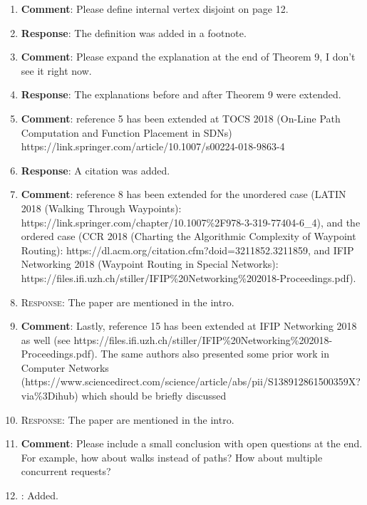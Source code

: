 \documentclass[11pt]{article}
\begin{document}
\begin{enumerate}
\item \textbf{Comment}: Please define internal vertex disjoint on page
  12.

\item[] \textbf{Response}: The definition was added in a footnote.

\item \textbf{Comment}: Please expand the explanation at the end of
  Theorem 9, I don't see it right now.

\item[] \textbf{Response}: The explanations before and after Theorem 9
  were extended.
  
\item \textbf{Comment}: reference 5 has been extended at TOCS 2018
  (On-Line Path Computation and Function Placement in SDNs)
  https://link.springer.com/article/10.1007/s00224-018-9863-4

\item[] \textbf{Response}: A citation was added.

\item \textbf{Comment}: reference 8 has been extended for the
  unordered case (LATIN 2018 (Walking Through Waypoints):
  https://link.springer.com/chapter/10.1007\%2F978-3-319-77404-6\_4),
  and the ordered case (CCR 2018 (Charting the Algorithmic Complexity
  of Waypoint Routing):
  https://dl.acm.org/citation.cfm?doid=3211852.3211859, and IFIP
  Networking 2018 (Waypoint Routing in Special Networks):
  https://files.ifi.uzh.ch/stiller/IFIP\%20Networking\%202018-Proceedings.pdf).
  
\item[] \textsc{Response}: The paper are mentioned in the intro.

\item \textbf{Comment}: Lastly, reference 15 has been extended at IFIP
  Networking 2018 as well (see
  https://files.ifi.uzh.ch/stiller/IFIP\%20Networking\%202018-Proceedings.pdf). The
  same authors also presented some prior work in Computer Networks
  (https://www.sciencedirect.com/science/article/abs/pii/S138912861500359X?via\%3Dihub)
  which should be briefly discussed

\item[] \textsc{Response}: The paper are mentioned in the intro.

\item \textbf{Comment}: Please include a small conclusion with open
  questions at the end. For example, how about walks instead of paths?
  How about multiple concurrent requests?

\item[] : Added.

\end{enumerate}
\end{document}
